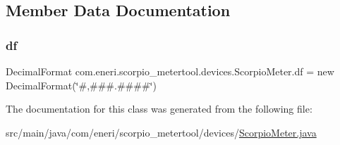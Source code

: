 \subsection{Member Data Documentation}
\mbox{\label{classcom_1_1eneri_1_1scorpio__metertool_1_1devices_1_1_scorpio_meter_ae747f921c6b265d8959f59db74e2a976}} 
\subsubsection{\texorpdfstring{df}{df}}
{\footnotesize\ttfamily Decimal\+Format com.\+eneri.\+scorpio\+\_\+metertool.\+devices.\+Scorpio\+Meter.\+df = new Decimal\+Format(\char`\"{}\#,\#\#\#.\#\#\#\#\char`\"{})\hspace{0.3cm}{\ttfamily [static]}}



The documentation for this class was generated from the following file\+:\begin{DoxyCompactItemize}
\item 
src/main/java/com/eneri/scorpio\+\_\+metertool/devices/\hyperlink{_scorpio_meter_8java}{Scorpio\+Meter.\+java}\end{DoxyCompactItemize}
